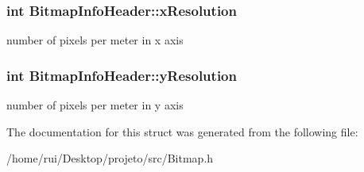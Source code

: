 \subsubsection[{\texorpdfstring{x\+Resolution}{xResolution}}]{\setlength{\rightskip}{0pt plus 5cm}int Bitmap\+Info\+Header\+::x\+Resolution}\hypertarget{structBitmapInfoHeader_a391cf1da75d16aee3b6539ccf5b29300}{}\label{structBitmapInfoHeader_a391cf1da75d16aee3b6539ccf5b29300}
number of pixels per meter in x axis 
\subsubsection[{\texorpdfstring{y\+Resolution}{yResolution}}]{\setlength{\rightskip}{0pt plus 5cm}int Bitmap\+Info\+Header\+::y\+Resolution}\hypertarget{structBitmapInfoHeader_af2fadf9c216cc9f3ce401096e35be1b7}{}\label{structBitmapInfoHeader_af2fadf9c216cc9f3ce401096e35be1b7}
number of pixels per meter in y axis 

The documentation for this struct was generated from the following file\+:\begin{DoxyCompactItemize}
\item 
/home/rui/\+Desktop/projeto/src/Bitmap.\+h\end{DoxyCompactItemize}
